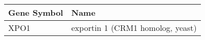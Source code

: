 \begin{tabular}{ll}
\toprule
Gene Symbol &                             Name \\
\midrule
       XPO1 & exportin 1 (CRM1 homolog, yeast) \\
\bottomrule
\end{tabular}
